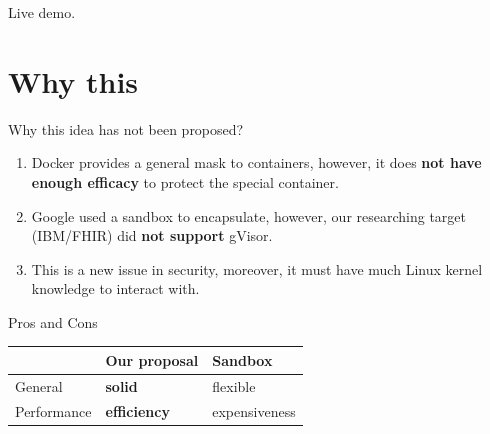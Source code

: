 \documentclass{beamer}
\begin{document}
\begin{CJK*}{UTF8}{bsmi}
    \begin{frame}
        \centering
        \Huge Live demo.
    \end{frame}

    \section{Why this}
    \begin{frame}{Why this idea has not been proposed?}
        \begin{enumerate}
            \item Docker provides a general mask to containers, however, it does {\color{blue} \textbf{not have enough efficacy}} to protect the special container.
            \item Google used a sandbox to encapsulate, however, our researching target (IBM/FHIR) did {\color{red} \textbf{not support}} gVisor.
            \item This is a new issue in security, moreover, it must have much Linux kernel knowledge to interact with.
        \end{enumerate}
    \end{frame}

    \begin{frame}{Pros and Cons}
        \begin{table}[]
            \begin{tabular}{|l|l|l|}
                \hline
                            & Our proposal                          & Sandbox       \\ \hline
                General     & {\color{red} \textbf{solid}}      & flexible      \\ \hline
                Performance & {\color{mygreen} \textbf{efficiency}} & expensiveness \\ \hline
            \end{tabular}
        \end{table}
    \end{frame}


\end{CJK*}
\end{document}
